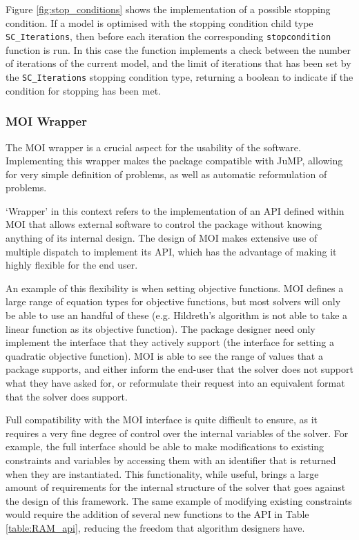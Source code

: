 Figure \ref{fig:stop_conditions} shows the implementation of a possible stopping condition. If a model is optimised with the stopping condition child type \texttt{SC\_Iterations}, then before each iteration the corresponding \texttt{stopcondition} function is run. In this case the function implements a check between the number of iterations of the current model, and the limit of iterations that has been set by the \texttt{SC\_Iterations} stopping condition type, returning a boolean to indicate if the condition for stopping has been met.

\subsubsection{MOI Wrapper}\label{subsub_moi}
The MOI wrapper is a crucial aspect for the usability of the software. Implementing this wrapper makes the package compatible with JuMP, allowing for very simple definition of problems, as well as automatic reformulation of problems. 

`Wrapper' in this context refers to the implementation of an API defined within MOI that allows external software to control the package without knowing anything of its internal design. The design of MOI makes extensive use of multiple dispatch to implement its API, which has the advantage of making it highly flexible for the end user. 

An example of this flexibility is when setting objective functions. MOI defines a large range of equation types for objective functions, but most solvers will only be able to use an handful of these (e.g. Hildreth's algorithm is not able to take a linear function as its objective function). The package designer need only implement the interface that they actively support (the interface for setting a quadratic objective function). MOI is able to see the range of values that a package supports, and either inform the end-user that the solver does not support what they have asked for, or reformulate their request into an equivalent format that the solver does support.

Full compatibility with the MOI interface is quite difficult to ensure, as it requires a very fine degree of control over the internal variables of the solver. For example, the full interface should be able to make modifications to existing constraints and variables by accessing them with an identifier that is returned when they are instantiated. This functionality, while useful, brings a large amount of requirements for the internal structure of the solver that goes against the design of this framework. The same example of modifying existing constraints would require the addition of several new functions to the API in Table \ref{table:RAM_api}, reducing the freedom that algorithm designers have. 

